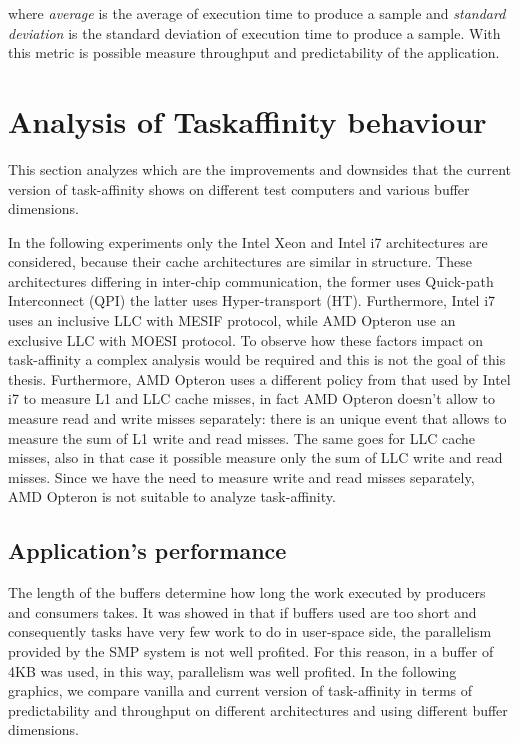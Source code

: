 where \textit{average} is the average of execution time to produce a sample and \textit{standard deviation} is the standard deviation of execution 
time to produce a sample. With this metric is possible measure throughput and predictability of the application.

\section{Analysis of Taskaffinity behaviour}

This section analyzes which are the improvements and downsides that the current version of task-affinity shows on different test computers and various
buffer dimensions.

In the following experiments only the Intel Xeon and Intel i7 architectures are considered, because their cache architectures are similar in structure.
These architectures differing in inter-chip communication, the former uses Quick-path Interconnect (QPI) the latter uses Hyper-transport (HT). 
Furthermore, Intel i7 uses an inclusive LLC with MESIF protocol, while AMD Opteron use an exclusive LLC with MOESI protocol. To observe how these 
factors impact on task-affinity a complex analysis would be required and this is not the goal of this thesis. 
Furthermore, AMD Opteron uses a different policy from that used by Intel i7 to measure L1 and LLC cache misses, in fact AMD Opteron doesn't allow to 
measure read and write misses separately: there is an unique event that allows to measure the sum of L1 write and read misses. The same goes for LLC cache 
misses, also in that case it possible measure only the sum of LLC write and read misses. Since we have the need to measure write and read misses separately, 
AMD Opteron is not suitable to analyze task-affinity.

\subsection{Application's performance}

The length of the buffers determine how long the work executed by producers and consumers takes. It was showed in \cite{lcs} that if buffers used are 
too short and consequently tasks have very few work to do in user-space side, the parallelism provided by the SMP system is not well profited. For 
this reason, in \cite{lcs} a buffer of 4KB was used, in this way, parallelism was well profited. In the following graphics, we compare vanilla and 
current version of task-affinity in terms of predictability and throughput on different architectures and using different buffer dimensions.

